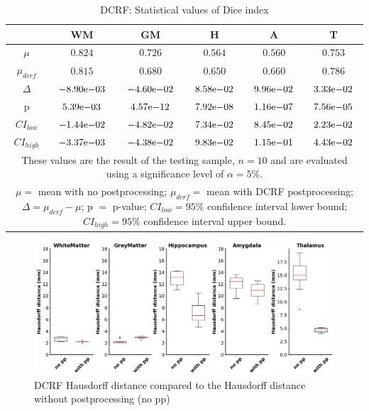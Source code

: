 \documentclass[journal]{IEEEtran}
\begin{document}
\begin{table}[ht]
\renewcommand{\arraystretch}{1.3}
\caption{DCRF: Statistical values of Dice index}
\label{tbl_dcrf_dice}
\centering
\begin{tabular}{c|c|c|c|c|c}
\hline
 & WM & GM & H & A & T\\
\hline
$\mu$&$0.824$&$0.726$&$0.564$&$0.560$&$0.753$\\
$\mu_{dcrf}$&$0.815$&$0.680$&$0.650$&$0.660$&$0.786$\\
$\Delta$&${-8.90}\mathrm{e}{-03}$&${-4.60}\mathrm{e}{-02}$&${8.58}\mathrm{e}{-02}$&${9.96}\mathrm{e}{-02}$&${3.33}\mathrm{e}{-02}$\\
p&${5.39}\mathrm{e}{-03}$&${4.57}\mathrm{e}{-12}$&${7.92}\mathrm{e}{-08}$&${1.16}\mathrm{e}{-07}$&${7.56}\mathrm{e}{-05}$\\
$CI_{low}$&${-1.44}\mathrm{e}{-02}$&${-4.82}\mathrm{e}{-02}$&${7.34}\mathrm{e}{-02}$&${8.45}\mathrm{e}{-02}$&${2.23}\mathrm{e}{-02}$\\
$CI_{high}$&${-3.37}\mathrm{e}{-03}$&${-4.38}\mathrm{e}{-02}$&${9.83}\mathrm{e}{-02}$&${1.15}\mathrm{e}{-01}$&${4.43}\mathrm{e}{-02}$\\
\hline
\multicolumn{6}{p{\textwidth}}{These values are the result of the testing sample, $n=10$ and are evaluated using a significance level of $\alpha = 5\%$. }\\
\multicolumn{6}{p{\textwidth}}{$\mu=$ mean with no postprocessing; $\mu_{dcrf}=$ mean with DCRF postprocessing; $\Delta=\mu_{dcrf}-\mu$; p $=$ p-value;  $CI_{low}= 95\%$ confidence interval lower bound; $CI_{high}= 95\%$ confidence interval upper bound.}\\

\end{tabular}
\end{table}



\begin{figure}[ht]
\centering
\includegraphics[width=\textwidth]{MIALab_Report/img/boxplots/DCRF-HD.png}
\caption{DCRF Hausdorff distance compared to the Hausdorff distance without postprocessing (no pp)}
\label{fig_dcrf-hd}
\end{figure}
\end{document}
